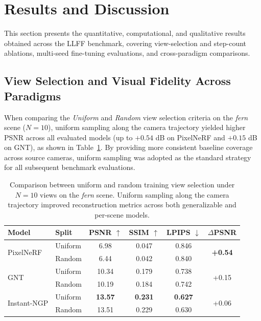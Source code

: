 \section{Results and Discussion}
\label{sec:results}

This section presents the quantitative, computational, and qualitative results obtained across the LLFF benchmark, covering view-selection and step-count ablations, multi-seed fine-tuning evaluations, and cross-paradigm comparisons.

\subsection{View Selection and Visual Fidelity Across Paradigms}
When comparing the \textit{Uniform} and \textit{Random} view selection criteria on the \textit{fern} scene ($N=10$), uniform sampling along the camera trajectory yielded higher PSNR across all evaluated models (up to $+0.54$ dB on PixelNeRF and $+0.15$ dB on GNT), as shown in Table~\ref{tab:split}. By providing more consistent baseline coverage across source cameras, uniform sampling was adopted as the standard strategy for all subsequent benchmark evaluations.

\begin{table}[!t]
\centering
\caption{Comparison between uniform and random training view selection under $N=10$ views on the \textit{fern} scene. Uniform sampling along the camera trajectory improved reconstruction metrics across both generalizable and per-scene models.}
\label{tab:split}
\scriptsize
\begin{tabular*}{\linewidth}{@{\extracolsep{\fill}}llcccc}
\toprule
Model & Split & PSNR $\uparrow$ & SSIM $\uparrow$ & LPIPS $\downarrow$ & $\Delta$PSNR \\
\midrule
\multirow{2}{*}{PixelNeRF}
  & Uniform   & 6.98   & 0.047    & 0.846    & \multirow{2}{*}{\textbf{+0.54}} \\
  & Random    & 6.44   & 0.042    & 0.840    &                        \\
\midrule
\multirow{2}{*}{GNT}
  & Uniform   & 10.34  & 0.179    & 0.738    & \multirow{2}{*}{+0.15} \\
  & Random    & 10.19  & 0.184    & 0.742    &                        \\
\midrule
\multirow{2}{*}{Instant-NGP}
  & Uniform   & \textbf{13.57} & \textbf{0.231} & \textbf{0.627} & \multirow{2}{*}{+0.06} \\
  & Random    & 13.51  & 0.229    & 0.630    &                        \\
\bottomrule
\end{tabular*}
\end{table}

